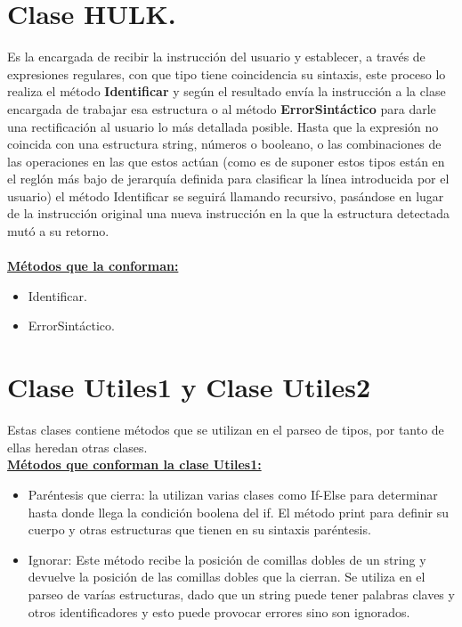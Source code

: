 \documentclass[12pt, letterpaper]{article}
\begin{document}
\section{Clase HULK.}
Es la encargada de recibir la instrucción del usuario y establecer, a través de expresiones regulares, con que tipo tiene coincidencia su sintaxis, este  proceso lo 
realiza el método \textbf{Identificar} y según el resultado envía la instrucción a la clase encargada de trabajar esa estructura o al método \textbf{ErrorSintáctico} 
para darle una rectificación al usuario lo más detallada posible. Hasta que la expresión no coincida con una estructura string, números o booleano, o las combinaciones
de las operaciones en las que estos actúan (como es de suponer estos tipos están en el reglón más bajo de jerarquía definida para clasificar la línea introducida por el 
usuario) el método Identificar se seguirá llamando recursivo, pasándose en lugar de la instrucción original una nueva instrucción en la que la estructura detectada 
mutó a su retorno. \\ \\

\textbf{\underline{Métodos que la conforman: }} 

\begin{itemize}
    \item Identificar.  
    \item ErrorSintáctico.
\end{itemize}
\newpage

\section{Clase Utiles1 y Clase Utiles2}
Estas clases contiene métodos que se utilizan en el parseo de tipos, por tanto de ellas heredan otras clases. \\ 

\textbf{\underline{Métodos que conforman la clase Utiles1: }} 

\begin{itemize}

    \item Paréntesis que cierra: la utilizan varias clases como If-Else para determinar hasta donde llega la condición boolena del if. El método print para definir su cuerpo y otras estructuras que tienen en su sintaxis paréntesis.
    \item Ignorar: Este método recibe la posición de comillas dobles de un string y devuelve la posición de las comillas dobles que la cierran. Se utiliza en el parseo de varías estructuras, dado que un string puede tener palabras claves y otros identificadores y esto puede provocar errores sino son ignorados.

\end{itemize}
\end{document}

